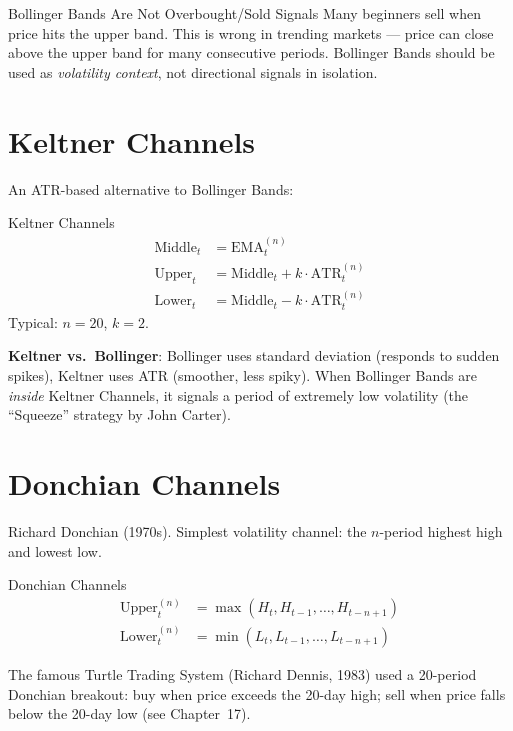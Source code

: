 \documentclass[12pt,a4paper,openany]{report}
\theoremstyle{definition}
\begin{document}
\begin{warningbox}{Bollinger Bands Are Not Overbought/Sold Signals}
Many beginners sell when price hits the upper band. This is wrong in trending markets — price can close above the upper band for many consecutive periods. Bollinger Bands should be used as \emph{volatility context}, not directional signals in isolation.
\end{warningbox}

\section{Keltner Channels}

An ATR-based alternative to Bollinger Bands:
\begin{definitionbox}{Keltner Channels}
\begin{align}
  \text{Middle}_t &= \text{EMA}_t^{(n)} \\
  \text{Upper}_t &= \text{Middle}_t + k \cdot \text{ATR}_t^{(n)} \\
  \text{Lower}_t &= \text{Middle}_t - k \cdot \text{ATR}_t^{(n)}
\end{align}
Typical: $n = 20$, $k = 2$.
\end{definitionbox}

\textbf{Keltner vs.\ Bollinger}: Bollinger uses standard deviation (responds to sudden spikes), Keltner uses ATR (smoother, less spiky). When Bollinger Bands are \emph{inside} Keltner Channels, it signals a period of extremely low volatility (the ``Squeeze'' strategy by John Carter).

\section{Donchian Channels}

Richard Donchian (1970s). Simplest volatility channel: the $n$-period highest high and lowest low.
\begin{definitionbox}{Donchian Channels}
\begin{align}
  \text{Upper}_t^{(n)} &= \max(H_{t}, H_{t-1}, \ldots, H_{t-n+1}) \\
  \text{Lower}_t^{(n)} &= \min(L_{t}, L_{t-1}, \ldots, L_{t-n+1})
\end{align}
\end{definitionbox}

The famous Turtle Trading System (Richard Dennis, 1983) used a 20-period Donchian breakout: buy when price exceeds the 20-day high; sell when price falls below the 20-day low (see Chapter~17).
\end{document}
